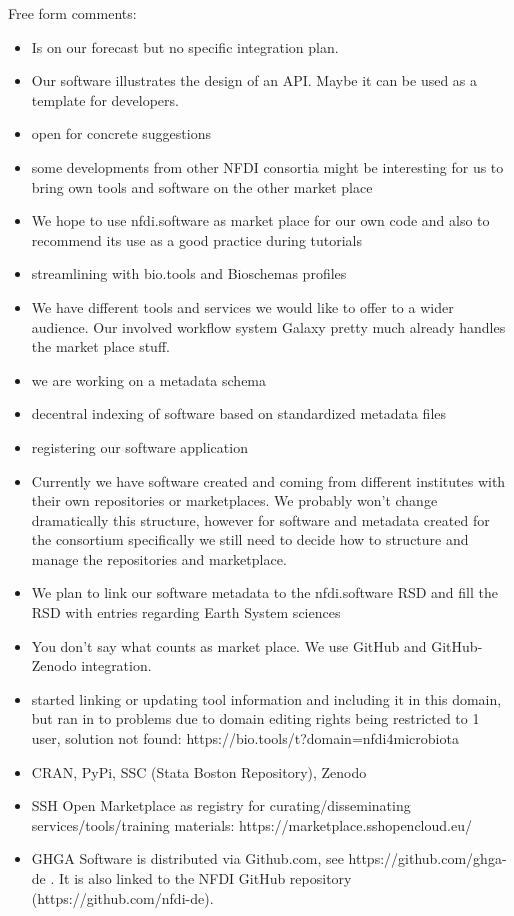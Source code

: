 \documentclass[headsepline,titlepage,twoside,12pt,toc=flat,headings=normal]{scrreprt}
\begin{document}
Free form comments:
\begin{itemize}
\item Is on our forecast but no specific integration plan.
\item Our software illustrates the design of an API. Maybe it can be used as a template for developers.
\item open for concrete suggestions
\item some developments from other NFDI consortia might be interesting for us to bring own tools and software on the other market place
\item We hope to use nfdi.software as market place for our own code and also to recommend its use as a good practice during tutorials
\item streamlining with bio.tools and Bioschemas profiles
\item We have different tools and services we would like to offer to a wider audience. Our involved workflow system Galaxy pretty much already handles the market place stuff.
\item we are working on a metadata schema
\item decentral indexing of software based on standardized metadata files
\item registering our software application 
\item Currently we have software created and coming from different institutes with their own repositories or marketplaces. We probably won't change dramatically this structure, however for software and metadata created for the consortium specifically we still need to decide how to structure and manage the repositories and marketplace.
\item We plan to link our software metadata to the nfdi.software RSD and fill the RSD with entries regarding Earth System sciences
\item You don't say what counts as market place. We use GitHub and GitHub-Zenodo integration.
\item started linking or updating tool information and including it in this domain, but ran in to problems due to domain editing rights being restricted to 1 user, solution not found: https://bio.tools/t?domain=nfdi4microbiota 
\item CRAN, PyPi, SSC (Stata Boston Repository), Zenodo
\item SSH Open Marketplace as registry for curating/disseminating services/tools/training materials: https://marketplace.sshopencloud.eu/
\item GHGA Software is distributed via Github.com, see https://github.com/ghga-de . It is also linked to the NFDI GitHub repository (https://github.com/nfdi-de).

\end{itemize}
\end{document}
